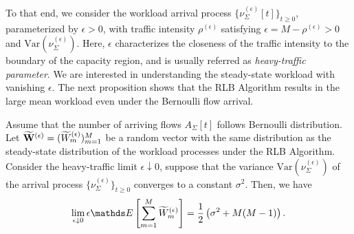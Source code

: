 \documentclass[10pt, conference, letterpaper]{IEEEtran} %
\begin{document}
To that end, we consider the workload arrival process $\{\nu_{\Sigma}^{(\epsilon)}[t]\}_{t\geq0}$, parameterized by $\epsilon>0$, with traffic intensity $\rho^{(\epsilon)}$ satisfying $\epsilon=M-\rho^{(\epsilon)}>0$ and $\text{Var}(\nu_{\Sigma}^{(\epsilon)})$. Here, $\epsilon$ characterizes the closeness of the traffic intensity to the boundary of the capacity region, and is usually referred as \emph{heavy-traffic parameter}. We are interested in understanding the steady-state workload with vanishing $\epsilon$. The next proposition shows that the RLB Algorithm results in the large mean workload even under the Bernoulli flow arrival.
\begin{proposition}
\label{prop:delay:RLB} Assume that the number of arriving flows $A_{\Sigma}[t]$ follows Bernoulli distribution. Let $\widetilde{\mathbf{W}}^{(\epsilon)}=(\widetilde{W}_m^{(\epsilon)})_{m=1}^{M}$ be a random vector with the same distribution as the steady-state distribution of the workload processes under the RLB Algorithm. Consider the heavy-traffic limit $\epsilon\downarrow0$, suppose that the variance $\text{Var}(\nu_{\Sigma}^{(\epsilon)})$ of the arrival process $\{\nu_{\Sigma}^{(\epsilon)}\}_{t\geq0}$ converges to a constant $\sigma^2$. Then, we have 
\begin{align}
\lim_{\epsilon\downarrow0}\epsilon\bE\left[\sum_{m=1}^{M}\wt{W}_m^{(\epsilon)}\right]=\frac{1}{2}\left(\sigma^2+M(M-1)\right).
\end{align}
\end{proposition}
\end{document}
